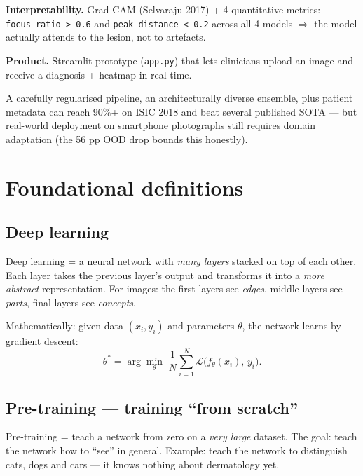 \documentclass[11pt,a4paper]{article}
\begin{document}
\textbf{Interpretability.} Grad-CAM (Selvaraju 2017) + 4 quantitative metrics: \texttt{focus\_ratio > 0.6} and \texttt{peak\_distance < 0.2} across all 4 models $\Rightarrow$ the model actually attends to the lesion, not to artefacts.

\textbf{Product.} Streamlit prototype (\texttt{app.py}) that lets clinicians upload an image and receive a diagnosis + heatmap in real time.

\begin{idea}
A carefully regularised pipeline, an architecturally diverse ensemble, plus patient metadata can reach 90\%+ on ISIC 2018 and beat several published SOTA --- but real-world deployment on smartphone photographs still requires domain adaptation (the 56 pp OOD drop bounds this honestly).
\end{idea}

\section{Foundational definitions}

\subsection{Deep learning}

\begin{simple}
Deep learning = a neural network with \textit{many layers} stacked on top of each other. Each layer takes the previous layer's output and transforms it into a \textit{more abstract} representation. For images: the first layers see \textit{edges}, middle layers see \textit{parts}, final layers see \textit{concepts}.
\end{simple}

Mathematically: given data $(x_i, y_i)$ and parameters $\theta$, the network learns by gradient descent:
\[
  \theta^* = \arg\min_\theta \; \frac{1}{N}\sum_{i=1}^N \mathcal{L}\bigl(f_\theta(x_i),\, y_i\bigr).
\]

\subsection{Pre-training --- training ``from scratch''}

\begin{simple}
Pre-training = teach a network from zero on a \textit{very large} dataset. The goal: teach the network how to ``see'' in general. Example: teach the network to distinguish cats, dogs and cars --- it knows nothing about dermatology yet.
\end{simple}
\end{document}
